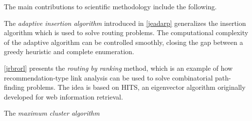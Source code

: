 \documentclass[dissertation,draft*]{aaltoseries}
\begin{document}
The main contributions to scientific methodology include the following.

The \emph{adaptive insertion algorithm} introduced in \ref{jeadarp} generalizes the insertion algorithm 
which is used to solve routing problems. The computational complexity of the adaptive algorithm can be controlled
smoothly, closing the gap between a greedy heuristic and complete enumeration.

\ref{jrbrorl} presents the \emph{routing by ranking} method, which is an example of how recommendation-type 
link analysis can be used to solve combinatorial path-finding problems. The idea is based on HITS, an eigenvector algorithm
originally developed for web information retrieval.

The \emph{maximum cluster algorithm} 





\end{document}
